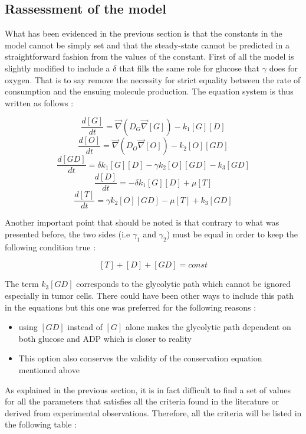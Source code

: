 \documentclass[11pt,a4paper]{article}
\begin{document}
\subsection{Rassessment of the model}
What  has been evidenced in the previous section is that  the constants in the model cannot be simply set and that the steady-state cannot be predicted in a straightforward fashion from the values of the constant. First of all the model is slightly modified to include a $\delta$ that fills the same role for glucose that $\gamma$ does for oxygen. That is to say remove the necessity for strict equality between the rate of consumption and the ensuing molecule production. The equation system is thus written as follows :

\[ \frac{d [G]}{d t} = \overrightarrow{\nabla} (D_G \overrightarrow{\nabla} [G]) - k_1 [G][D]  \]
\[ \frac{d [O]}{d t} = \overrightarrow{\nabla} (D_O \overrightarrow{\nabla} [O]) - k_2 [O][GD]  \]
\[ \frac{d [GD]}{d t} =  \delta k_1 [G][D] - \gamma k_2 [O][GD] - k_3[GD] \]
\[ \frac{d [D]}{d t} =  -\delta k_1 [G][D] + \mu [T]  \]
\[ \frac{d [T]}{d t} =  \gamma k_2 [O][GD] - \mu [T] + k_3[GD] \]


Another important point that should be noted is that contrary to what was presented before, the two sides (i.e $\gamma_1$ and $\gamma_2$) must be equal in order to keep the following condition true : 

\[ [T] + [D] + [GD] = const \]

The term $k_3[GD]$ corresponds to the glycolytic path which cannot be ignored especially in tumor cells. There could have been other ways to include this path in the equations but this one was preferred for the following reasons :
\begin{itemize}
\item using $[GD]$ instead of $[G]$ alone makes the glycolytic path dependent on both glucose and ADP which is closer to reality
\item This option also conserves the validity of the conservation equation mentioned above 
\end{itemize}

As explained in the previous section,  it is in fact difficult to find a set of values for all the parameters that satisfies all the criteria found in the literature or derived from experimental observations. Therefore, all the criteria will be listed in the following table :
\end{document}
